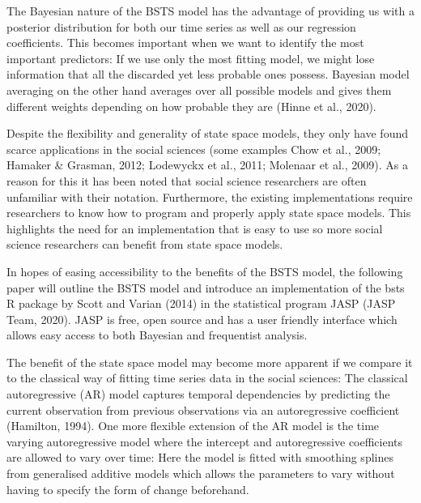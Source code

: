 \documentclass[a4paper, doc, natbib]{apa7}
\begin{document}
The Bayesian nature of the BSTS model has the advantage of providing us with a posterior distribution for both our time series as well as our regression coefficients. This becomes important when we want to identify the most important predictors: If we use only the most fitting model, we might lose information that all the discarded yet less probable ones possess. Bayesian model averaging on the other hand averages over all possible models and gives them different weights depending on how probable they are (Hinne et al., 2020). 

Despite the flexibility and generality of state space models, they only have found scarce applications in the social sciences (some examples Chow et al., 2009; Hamaker & Grasman, 2012; Lodewyckx et al., 2011; Molenaar et al., 2009). As a reason for this it has been noted that social science researchers are often unfamiliar with their notation. Furthermore, the existing implementations require researchers to know how to program and properly apply state space models. This highlights the need for an implementation that is easy to use so more social science researchers can benefit from state space models.

In hopes of easing accessibility to the benefits of the BSTS model, the following paper will outline the BSTS model and introduce an implementation of the bsts R package by Scott and Varian (2014) in the statistical program JASP (JASP Team, 2020). JASP is free, open source and has a user friendly interface which allows easy access to both Bayesian and frequentist analysis.

The benefit of the state space model may become more apparent if we compare it to the classical way of fitting time series data in the social sciences: The classical autoregressive (AR)  model captures temporal dependencies by predicting the current observation from previous observations via an autoregressive coefficient  (Hamilton, 1994). One more flexible extension of the AR model is the time varying autoregressive model where the intercept and autoregressive coefficients are allowed to vary over time: Here the model is fitted with smoothing splines from generalised additive models \citep{bringmannChangingDynamicsTimevarying2017,woodGeneralizedAdditiveModels2017} which allows the parameters to vary without having to specify the form of change beforehand.
\end{document}
